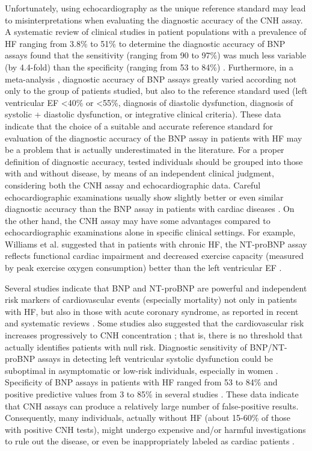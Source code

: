 \documentclass[14pt,a4paper,onecolumn]{extarticle}
\begin{document}
Unfortunately, using echocardiography as the unique reference standard may lead to
misinterpretations when evaluating the diagnostic accuracy of the CNH assay. A systematic review of clinical studies in patient populations with a prevalence of HF ranging from 3.8\% to 51\% to determine the diagnostic accuracy of BNP assays found that
the sensitivity (ranging from 90 to 97\%) was much less variable (by 4.4-fold) than the
specificity (ranging from 53 to 84\%) \citep{bib35}. Furthermore, in a meta-analysis \citep{bib372}, diagnostic accuracy of BNP assays greatly varied according not only to the group of patients
studied, but also to the reference standard used (left ventricular EF <40\% or <55\%,
diagnosis of diastolic dysfunction, diagnosis of systolic + diastolic dysfunction, or integrative clinical criteria). These data indicate that the choice of a suitable and accurate
reference standard for evaluation of the diagnostic accuracy of the BNP assay in patients
with HF may be a problem that is actually underestimated in the literature. For a proper definition of diagnostic accuracy, tested individuals should be grouped into those
with and without disease, by means of an independent clinical judgment, considering
both the CNH assay and echocardiographic data.
Careful echocardiographic examinations usually show slightly better or even similar diagnostic accuracy than the BNP assay in patients with cardiac diseases \citep{bib373} \citep{bib374}. On
the other hand, the CNH assay may have some advantages compared to echocardiographic examinations alone in specific clinical settings. For example, Williams et al.
suggested that in patients with chronic HF, the NT-proBNP assay reflects functional
cardiac impairment and decreased exercise capacity (measured by peak exercise oxygen consumption) better than the left ventricular EF \citep{bib375}.

Several studies indicate that BNP and NT-proBNP are powerful and independent
risk markers of cardiovascular events (especially mortality) not only in patients with HF,
but also in those with acute coronary syndrome, as reported in recent and systematic
reviews \citep{bib35} \citep{bib376} \citep{bib377} \citep{bib378}. Some studies also suggested that the cardiovascular risk increases progressively to CNH concentration \citep{bib377} \citep{bib378} \citep{bib379}; that is, there is no threshold that actually identifies patients with null risk.
Diagnostic sensitivity of BNP/NT-proBNP assays in detecting left ventricular systolic dysfunction could be suboptimal in asymptomatic or low-risk individuals, especially in women \citep{bib39}. Specificity of BNP assays in patients with HF ranged from 53 to
84\% and positive predictive values from 3 to 85\% in several studies \citep{bib35}. These data indicate that CNH assays can produce a relatively large number of false-positive results.
Consequently, many individuals, actually without HF (about 15-60\% of those with positive CNH tests), might undergo expensive and/or harmful investigations to rule out
the disease, or even be inappropriately labeled as cardiac patients \citep{bib35}.
\end{document}
